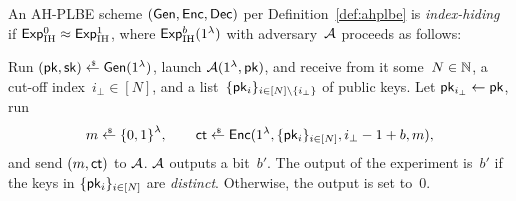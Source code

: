 \begin{definition}\label{def:ahplbe-index-hiding}
An AH-PLBE scheme $({\smash{\mathsf{Gen}}},{\smash{\mathsf{Enc}}},{\smash{\mathsf{Dec}}})$ per Definition~\ref{def:ahplbe}
is \emph{index-hiding} if ${{\smash{\mathsf{Exp}}_{\textup{IH}}^{0}}\approx{\smash{\mathsf{Exp}}_{\textup{IH}}^{1}}}$,
where ${\smash{\mathsf{Exp}}_{\textup{IH}}^{b}}(1^\lambda)$ with adversary~${\mathcal{A}}$ proceeds as follows:
\begin{security}
Run
${(\pk,\sk)\draws\Gen(1^\lambda)}$,
launch ${\mathcal{A}}(1^\lambda,{\smash{\mathsf{pk}}})$, and
receive from it
some~${N\in{\mathbb{N}}}$,
a cut-off index~${i_\bot\in[N]}$, and
a list~$\{\pk_i\}_{i\in[N]\setminus\{i_\bot\}}$ of public keys.
Let ${\pk_{i_\bot}\gets\pk}$,
run
\begin{align*}
m\draws\bit^\lambda,\qquad
\ct\draws\Enc(1^\lambda,\{\pk_i\}_{i\in[N]},i_\bot-1+b,m),
\end{align*}
and send $(m,{\smash{\mathsf{ct}}})$ to ${\mathcal{A}}$.
${\mathcal{A}}$ outputs a bit~$b'$.
The output of the experiment is~$b'$ if
the keys in $\{{\smash{\mathsf{pk}}}_i\}_{i\in[N]}$ are \emph{distinct}.
Otherwise, the output is set to~$0$.
\end{security}
\end{definition}
